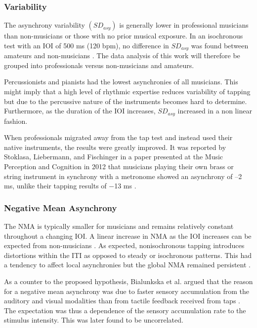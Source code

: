 \subsubsection{Variability}
The asynchrony variability $(SD_{asy})$ is generally lower in professional musicians than non-musicians or those with no prior musical exposure. In an isochronous test with an IOI of 500 ms (120 bpm), no difference in $SD_{asy}$ was found between amateurs and non-musicians \cite{repp2013sensorimotor}. The data analysis of this work will therefore be grouped into professionals versus non-musicians and amateurs.

Percussionists and pianists had the lowest asynchronies of all musicians. This might imply that a high level of rhythmic expertise reduces variability of tapping but due to the percussive nature of the instruments becomes hard to determine. Furthermore, as the duration of the IOI increases, $SD_{asy}$ increased in a non linear fashion.

When professionals migrated away from the tap test and instead used their native instruments, the results were greatly improved. It was reported by Stoklasa, Liebermann, and Fischinger in a paper presented at the Music Perception and Cognition in 2012 that musicians playing their own brass or string instrument in synchrony with a metronome showed an asynchrony of $–$2 ms, unlike their tapping results of $-$13 ms \cite{repp2013sensorimotor}.

\subsubsection{Negative Mean Asynchrony}
The NMA is typically smaller for musicians and remains relatively constant throughout a changing IOI. A linear increase in NMA as the IOI increases can be expected from non-musicians \cite{repp2013sensorimotor}. As expected, nonisochronous tapping introduces distortions within the ITI as opposed to steady or isochronous patterns. This had a tendency to affect local asynchronies but the global NMA remained persistent \cite{polak2016both}.
 
As a counter to the proposed hypothesis, Bialunkska et al. argued that the reason for a negative mean asynchrony was due to faster sensory accumulation from the auditory and visual modalities than from tactile feedback received from taps \cite{bialunska2011increasing}. The expectation was thus a dependence of the sensory accumulation rate to the stimulus intensity. This was later found to be uncorrelated.

